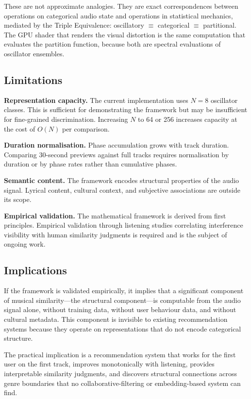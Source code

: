 \documentclass[11pt,twocolumn,a4paper]{article}
\begin{document}
These are not approximate analogies. They are exact correspondences
between operations on categorical audio state and operations in
statistical mechanics, mediated by the Triple Equivalence: oscillatory
$\equiv$ categorical $\equiv$ partitional. The GPU shader that renders
the visual distortion is the same computation that evaluates the
partition function, because both are spectral evaluations of oscillator
ensembles.

\subsection{Limitations}

\textbf{Representation capacity.} The current implementation uses
$N = 8$ oscillator classes. This is sufficient for demonstrating the
framework but may be insufficient for fine-grained discrimination.
Increasing $N$ to 64 or 256 increases capacity at the cost of $O(N)$
per comparison.

\textbf{Duration normalisation.} Phase accumulation grows with track
duration. Comparing 30-second previews against full tracks requires
normalisation by duration or by phase rates rather than cumulative
phases.

\textbf{Semantic content.} The framework encodes structural
properties of the audio signal. Lyrical content, cultural context,
and subjective associations are outside its scope.

\textbf{Empirical validation.} The mathematical framework is derived
from first principles. Empirical validation through listening studies
correlating interference visibility with human similarity judgments is
required and is the subject of ongoing work.

\subsection{Implications}

If the framework is validated empirically, it implies that a
significant component of musical similarity---the structural
component---is computable from the audio signal alone, without
training data, without user behaviour data, and without cultural
metadata. This component is invisible to existing recommendation
systems because they operate on representations that do not encode
categorical structure.

The practical implication is a recommendation system that works for
the first user on the first track, improves monotonically with
listening, provides interpretable similarity judgments, and discovers
structural connections across genre boundaries that no
collaborative-filtering or embedding-based system can find.
\end{document}
